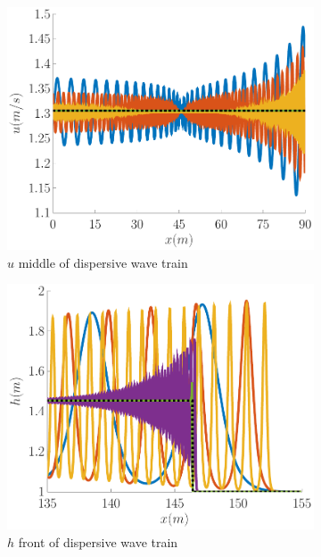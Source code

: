 \documentclass[10pt]{article}
\begin{document}
\begin{figure}
	\begin{subfigure}{0.32\textwidth}
		\centering
		\includegraphics[width=\textwidth]{./Figures/Simulations/Study/Serre2SWWECloser/uMiddle.pdf}
		\caption{$u$ middle of dispersive wave train}
	\end{subfigure}
	\begin{subfigure}{0.32\textwidth}
	\centering
	\includegraphics[width=\textwidth]{./Figures/Simulations/Study/Serre2SWWECloser/hFront.pdf}
	\caption{$h$ front of dispersive wave train}
	\end{subfigure}
	\begin{subfigure}{0.32\textwidth}

\end{subfigure}
\end{figure}
\end{document}
